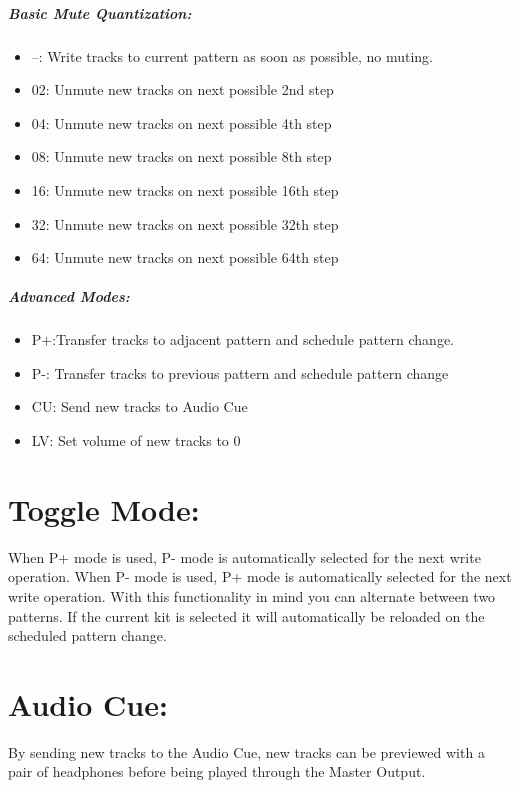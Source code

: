 \subparagraph{Basic Mute Quantization:}
\begin{itemize}
\item{--: Write tracks to current pattern as soon as possible, no muting.}
\item{02: Unmute new tracks on next possible 2nd step}
\item{04: Unmute new tracks on next possible 4th step}
\item{08: Unmute new tracks on next possible 8th step}
\item{16: Unmute new tracks on next possible 16th step}
\item{32: Unmute new tracks on next possible 32th step }
\item{64: Unmute new tracks on next possible 64th step}
\end{itemize}

\subparagraph{Advanced Modes:}
\begin{itemize}
\item{P+:Transfer tracks to adjacent pattern and schedule pattern change.}
\item{P-: Transfer tracks to previous pattern and schedule pattern change}

\item{CU: Send new tracks to Audio Cue }
\item{LV: Set volume of new tracks to 0}
\end{itemize}

\section{Toggle Mode:}
When P+ mode is used, P- mode is automatically selected for the next write operation. When P- mode is used, P+ mode is automatically selected for the next write operation. With this functionality in mind you can alternate between two patterns. If the current kit is selected it will automatically be reloaded on the scheduled pattern change.

\section{Audio Cue:}

By sending new tracks to the Audio Cue, new tracks can be previewed with a pair of headphones before being played through the Master Output.
